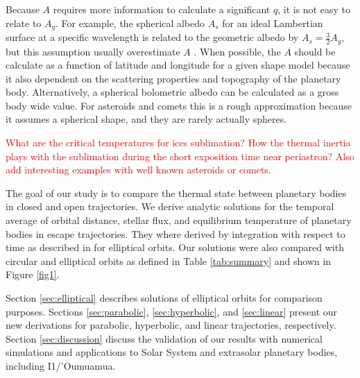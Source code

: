\documentclass[a4paper,fleqn,usenatbib]{mnras}
\newcommand{\fix}{\textcolor{red}}
\begin{document}
Because $A$ requires more information to calculate a significant $q$, it is not easy to relate to $A_g$. For example, the spherical albedo $A_s$ for an ideal Lambertian surface at a specific wavelength is related to the geometric albedo by $A_s=\frac{3}{2}A_g$, but this assumption usually overestimate $A$ \citep{2016ApJ...822...76D}. When possible, the $A$ should be calculate as a function of latitude and longitude for a given shape model because it also dependent on the scattering properties and topography of the planetary body. Alternatively, a spherical bolometric albedo can be calculated as a gross body wide value. For asteroids and comets this is a rough approximation because it assumes a spherical shape, and they are rarely actually spheres.

\fix{What are the critical temperatures for ices sublimation? How the thermal inertia plays with the sublimation during the short exposition time near periastron? Also add interesting examples with well known asteroids or comets.}

The goal of our study is to compare the thermal state between planetary bodies in closed and open trajectories. We derive analytic solutions for the temporal average of orbital distance, stellar flux, and equilibrium temperature of planetary bodies in escape trajectories. They where derived by integration with respect to time as described in \citet{2017ApJ...837L...1M} for elliptical orbits. Our solutions were also compared with circular and elliptical orbits as defined in Table \ref{tab:summary} and shown in Figure \ref{fig1}. 

Section \ref{sec:elliptical} describes solutions of elliptical orbits for comparison purposes. Sections \ref{sec:parabolic}, \ref{sec:hyperbolic}, and \ref{sec:linear} present our new derivations for parabolic, hyperbolic, and linear trajectories, respectively. Section \ref{sec:discussion} discuss the validation of our results with numerical simulations and applications to Solar System and extrasolar planetary bodies, including I1/'Oumuamua.
\end{document}
